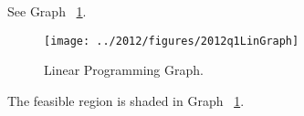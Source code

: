 \begin{subquestions}
\begin{subsubquestions}
\end{subsubquestions}


\subquestion

\begin{subsubquestions}


\subsubquestion

See Graph ~\ref{2012:q1:graph:Graph1}.
\begin{figure}
	\begin{center}
		\texttt{[image: ../2012/figures/2012q1LinGraph]}
		\caption{\label{2012:q1:graph:Graph1} Linear Programming Graph.}
	\end{center}
\end{figure}



\subsubquestion

The feasible region is shaded in Graph ~\ref{2012:q1:graph:Graph1}.

\end{subsubquestions}


\subquestion

\begin{subsubquestions}
	

\subsubquestion


\end{subsubquestions}
\end{subquestions}
